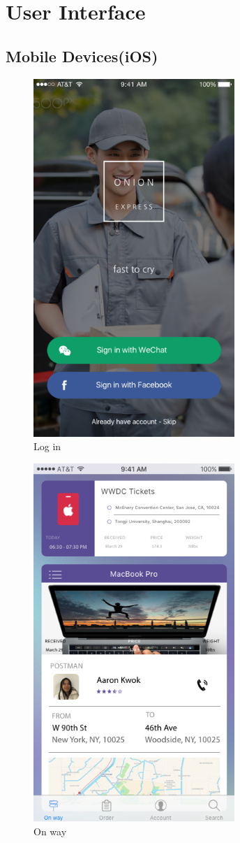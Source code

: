 \documentclass[12pt]{scrreprt}
\begin{document}
\chapter{User Interface}
\section{Mobile Devices(iOS)}
\begin{figure}[htbp]
  \centering\includegraphics[width=3in]{DocumentRes/Login.png}
  \caption{Log in}
\end{figure}
\begin{figure}[htbp]
  \centering\includegraphics[width=3in]{DocumentRes/OnWay.png}
  \caption{On way}
\end{figure}
\end{document}

